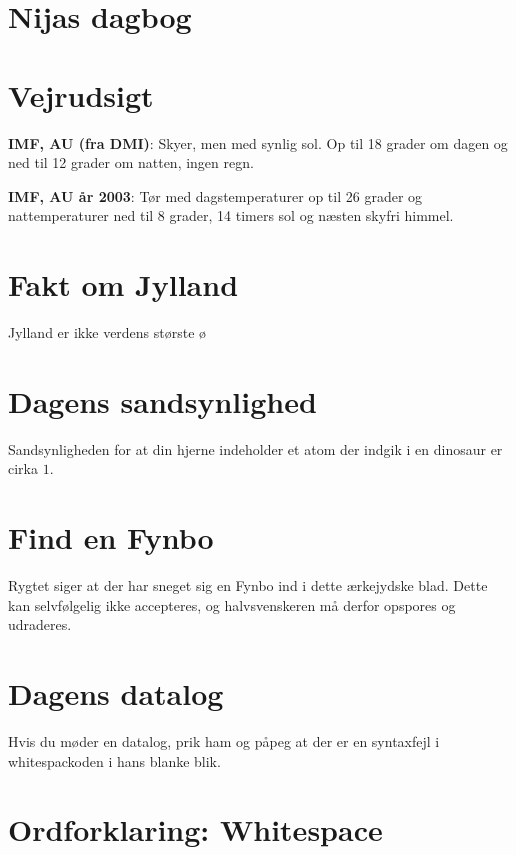 \documentclass[article,10pt,a4,oneside]{memoir}
\begin{document}
\begin{minipage}[b]{0.9\textwidth}
\begin{minipage}[t]{0.47\textwidth}
\vspace{1mm}
\section*{Nijas dagbog}


\end{minipage}%
\hfill\begin{minipage}[t]{0.47\textwidth}
\vspace{1mm}
\section*{Vejrudsigt}
\textbf{IMF, AU (fra DMI)}: Skyer, men med synlig sol. Op til 18 grader om dagen og ned til 12 grader om natten, ingen regn.

\textbf{IMF, AU år 2003}: Tør med dagstemperaturer op til 26 grader og nattemperaturer ned til 8 grader, 14 timers sol og næsten skyfri himmel.

\section*{Fakt om Jylland}
Jylland er ikke verdens største ø

\section*{Dagens sandsynlighed}
Sandsynligheden for at din hjerne indeholder et atom der indgik i en dinosaur er cirka $1$.

\section*{Find en Fynbo}
Rygtet siger at der har sneget sig en Fynbo ind i dette ærkejydske blad. Dette kan selvfølgelig ikke accepteres, og halvsvenskeren må derfor opspores og udraderes.

\section*{Dagens datalog}
Hvis du møder en datalog, prik ham og påpeg at der er en syntaxfejl i whitespackoden i hans blanke blik.

\section*{Ordforklaring: Whitespace}
\vspace{4cm}
\end{minipage}


\end{minipage}
\end{document}
